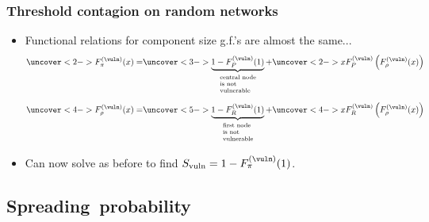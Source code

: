 \begin{frame}
  \frametitle{Threshold contagion on random networks}

  \begin{itemize}
  \item<1-> Functional relations for component size g.f.'s
    are almost the same...
    $$
    \uncover<2->{
      {F}_{\pi}^{(\vuln)}(x)
      =
    }
    \uncover<3->{
      \underbrace{
        1-{F}_P^{(\vuln)}(1)
      }_{
        \mbox{
          \scriptsize
          \begin{tabular}{l}
            central node \\
            is not \\
            vulnerable
          \end{tabular}
        }
      }
      +
    }
    \uncover<2->{
      x {F}_{P}^{(\vuln)}
      \left(
        {F}_{\rho}^{(\vuln)} (x)
      \right)
    }
    $$
    $$
    \uncover<4->{
      {F}_{\rho}^{(\vuln)}(x)
      =
    }
    \uncover<5->{
      \underbrace{
        1-{F}_R^{(\vuln)}(1)
      }_{
        \mbox{
          \scriptsize
          \begin{tabular}{l}
            first node \\
            is not \\
            vulnerable
          \end{tabular}
        }
      }
      +
    }
    \uncover<4->{
      x {F}_{R}^{(\vuln)}
      \left(
        {F}_{\rho}^{(\vuln)} (x)
      \right)
    }
    $$
  \item<6->
    Can now solve as before to find $S_{\textnormal{vuln}} = 1 - F_\pi^{(\vuln)}(1)$.
  \end{itemize}

\end{frame}


\subsection{Spreading\ probability}


